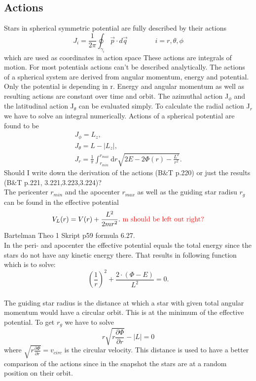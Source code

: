 \documentclass[a4paper,12pt,abstracton]{scrartcl}
\begin{document}
\subsection{Actions}
Stars in spherical symmetric potential are fully described by their actions \begin{equation}
J_i=\frac{1}{2\pi}\oint_{\gamma_i}\vec{p}\cdot d\vec{q} \qquad\qquad i=r,\theta,\phi
\end{equation} which are used as coordinates in action space
These actions are integrals of motion. For most potentials actions can't be described analytically. The actions of a spherical system are derived from angular momentum, energy and potential. Only the potential is depending in r. Energy and angular momentum as well as resulting actions are constant over time and orbit. The azimuthal action J\(_\phi\) and the latitudinal action J\(_\theta\) can be evaluated simply. To calculate the radial action J\(_r\) we have to solve an integral numerically. Actions of a spherical potential are found to be \begin{align}
J_\phi=L_z, \\ J_\theta=L-|L_z|, \\ J_r=\frac{1}{\pi} \int_{r_{min}}^{r_{max}} \mathrm{d}r \sqrt{2E-2\Phi(r)-\frac{L^2}{r^2}}.
\end{align}\color{red} Should I write down the derivation of the actions (B\&T p.220) or just the results (B\&T p.221, 3.221,3.223,3.224)?\color{black} \\ The pericenter \(r_{min}\) and the apocenter \(r_{max}\) as well as the guiding star radisu \(r_g\) can be found in the effective potential \begin{equation}
V_L(r)=V(r)+\frac{L^2}{2mr^2}.\  \color{red} \mathrm{m\ should\ be\ left\ out\ right?} \color{black}
\end{equation} \color{red} Bartelman Theo 1 Skript p59 formula 6.27. \\ \color{black} In the peri- and apocenter the effective potential equals the total energy since the stars do not have any kinetic energy there. That results in following function which is to solve: \[\left(\frac{1}{r}\right)^2+\frac{2\cdot (\Phi-E)}{L^2}=0.\] \\ The guiding star radius is the distance at which a star with given total angular momentum would have a circular orbit. This is at the minimum of the effective potential. To get \(r_g\) we have to solve \[r\sqrt{r\frac{\partial\Phi}{\partial r}}-|L|=0\] where \(\sqrt{r\frac{\partial\Phi}{\partial r}}=v_{circ}\) is the circular velocity. This distance is used to have a better comparison of the actions since in the snapshot the stars are at a random position on their orbit.
\end{document}

